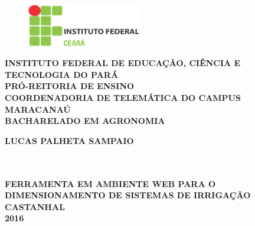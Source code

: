 \thispagestyle{empty}

\vfill
 \begin{center}
    \begin{figure}[t]
     \centering
            \includegraphics[width=5cm]{figures/IF_logo.eps}\\[-0.1in]
     \end{figure}

    {\large\bfseries INSTITUTO FEDERAL DE EDUCAÇÃO, CIÊNCIA E TECNOLOGIA DO PARÁ} \\
    {\large\bfseries PRÓ-REITORIA DE ENSINO} \\
    {\large\bfseries COORDENADORIA DE TELEMÁTICA DO CAMPUS MARACANAÚ}  \\ 
    {\large\bfseries BACHARELADO EM AGRONOMIA}  \\ 

    \vspace*{1in}
    \begin{large} \bfseries LUCAS PALHETA SAMPAIO \end{large}\\[0.4in]

    \vspace*{4cm}
    \noindent \\
    \large\bfseries{FERRAMENTA EM AMBIENTE WEB PARA O DIMENSIONAMENTO DE SISTEMAS DE IRRIGAÇÃO} \\
    \vfill
    \large\bfseries{ CASTANHAL \\ 2016}
\end{center}

\normalsize